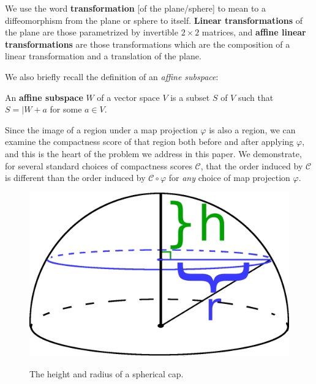 \begin{definition}
We use the word \textbf{transformation} [of the plane/sphere] to mean
to a diffeomorphism from the plane or sphere to itself.
\textbf{Linear transformations} of the plane are those parametrized by
invertible $2{\times}2$ matrices, and \textbf{affine linear
transformations} are those transformations which are the composition
of a linear transformation and a translation of the plane.
\end{definition}
We also briefly recall the definition of an \textit{affine subspace}:
\begin{definition}
	An \textbf{affine subspace} $W$ of a vector space $V$ 
   is a subset $S$ of $V$ such 
  that $S = \vert W + a$ for some $a\in V$.
\end{definition}

Since the image of a region under a map projection $\varphi$ is also
a region, we can examine the compactness score of that region both 
before and after applying $\varphi$, and this is the heart of the
problem we address in this paper.  We demonstrate, for several
standard choices of compactness scores $\mathcal{C}$, that the order
induced by $\mathcal{C}$ is different than the order induced by
$\mathcal{C}\circ\varphi$ for \textit{any} choice of map projection
$\varphi$.


\begin{figure}
	\centering
	\includegraphics[width=.4\textwidth]{figs/spherecapschema}\\[1.5em]
	\caption{ The height and radius of a spherical cap. }
	\label{fig:caphr}
\end{figure}
